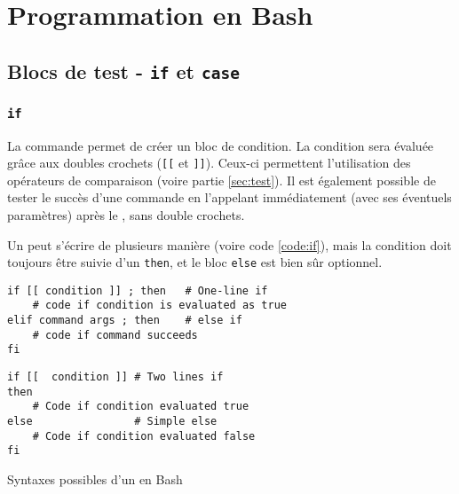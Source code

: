 \section{Programmation en Bash}

\subsection{Blocs de test - \texttt{if} et \texttt{case}}

\subsubsection{\texttt{if}} 
La commande  permet de créer un bloc de condition. La condition sera évaluée grâce aux doubles crochets (\texttt{[[} et \texttt{]]}). Ceux-ci permettent l'utilisation des opérateurs de comparaison (voire partie \ref{sec:test}). Il est également possible de tester le succès d'une commande en l'appelant immédiatement (avec ses éventuels paramètres) après le , sans double crochets.

\begin{nscenter}
\end{nscenter}

Un  peut s'écrire de plusieurs manière (voire code \ref{code:if}), mais la condition doit toujours être suivie d'un \texttt{then}, et le bloc \texttt{else} est bien sûr optionnel.

\begin{code}
    \centering
    \noindent\begin{minipage}{.5\textwidth}
    \begin{verbatim}
if [[ condition ]] ; then   # One-line if
    # code if condition is evaluated as true
elif command args ; then    # else if
    # code if command succeeds
fi
\end{verbatim}
\end{minipage}\hfill
\begin{minipage}{.45\textwidth}
\begin{verbatim}
if [[  condition ]] # Two lines if
then
    # Code if condition evaluated true
else                # Simple else
    # Code if condition evaluated false
fi
\end{verbatim}
\end{minipage}\hfill
    \caption{Syntaxes possibles d'un  en Bash}
    \label{code:if}
\end{code}


